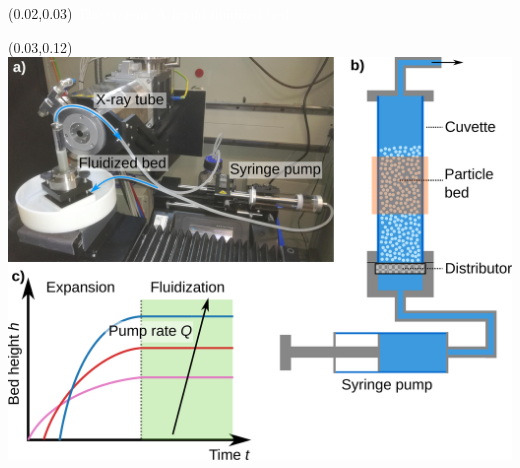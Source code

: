 \begin{frame}[noframenumbering]

\begin{textblock}{0.6}(0.02,0.03)
	\textcolor{white}{
		\Large The system: A liquid fluidized bed}
\end{textblock}

\begin{textblock}{0.6}(0.03,0.12)
	\includegraphics[width=\textwidth]{Sources/X-DFA/experiment-fluidized_bed_1.pdf}
\end{textblock}




\end{frame}
